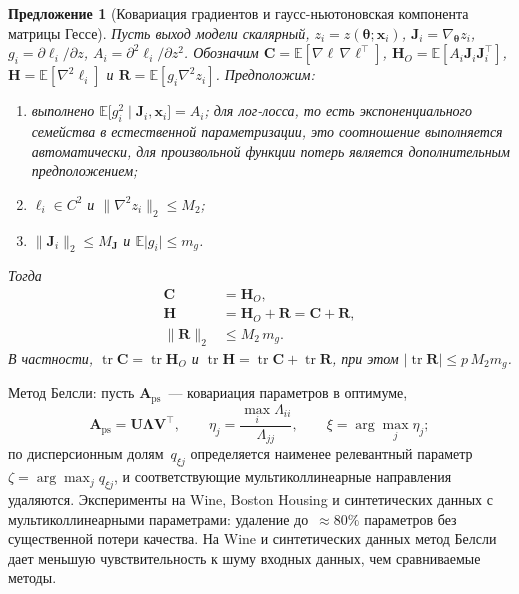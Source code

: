 \documentclass{dissert}
\newtheorem{proposition}[theorem]{Предложение}
\begin{document}
\begin{proposition}[Ковариация градиентов и гаусс-ньютоновская компонента матрицы Гессе]
Пусть выход модели скалярный, $z_i=z(\boldsymbol{\theta};\mathbf{x}_i)$, $\mathbf{J}_i=\nabla_{\boldsymbol{\theta}}z_i$, $g_i=\partial\ell_i/\partial z$, $A_i=\partial^2\ell_i/\partial z^2$.
Обозначим $\mathbf{C}=\mathbb{E}[\nabla\ell\,\nabla\ell^{\top}]$, $\mathbf{H}_O=\mathbb{E}[A_i\mathbf{J}_i\mathbf{J}_i^{\top}]$, $\mathbf{H}=\mathbb{E}[\nabla^2\ell_i]$ и $\mathbf{R}=\mathbb{E}[g_i\nabla^2z_i]$.
Предположим:
\begin{enumerate}[1)]
    \item выполнено $\mathbb{E}\bigl[g_i^2\mid\mathbf{J}_i,\mathbf{x}_i\bigr]=A_i$; для лог-лосса, то есть экспоненциального семейства в естественной параметризации, это соотношение выполняется автоматически, для произвольной функции потерь является дополнительным предположением;
    \item $\ell_i\in C^2$ и $\bigl\|\nabla^2z_i\bigr\|_2\le M_2$;
    \item $\bigl\|\mathbf{J}_i\bigr\|_2\le M_{\mathbf{J}}$ и $\mathbb{E}\lvert g_i\rvert\le m_g$.
\end{enumerate}
Тогда
\begin{align}
    \mathbf{C}&=\mathbf{H}_O,\\
    \mathbf{H}&=\mathbf{H}_O+\mathbf{R}=\mathbf{C}+\mathbf{R},\\
    \bigl\|\mathbf{R}\bigr\|_2&\le M_2\,m_g.
\end{align}
В частности, $\operatorname{tr}\mathbf{C}=\operatorname{tr}\mathbf{H}_O$ и $\operatorname{tr}\mathbf{H}=\operatorname{tr}\mathbf{C}+\operatorname{tr}\mathbf{R}$, при этом $\lvert\operatorname{tr}\mathbf{R}\rvert\le p\,M_2m_g$.
\end{proposition}

Метод Белсли: пусть $\mathbf{A}_{\mathrm{ps}}$~--- ковариация параметров в оптимуме,
\[
    \mathbf{A}_{\mathrm{ps}}=\mathbf{U}\boldsymbol{\Lambda}\mathbf{V}^\top,\qquad
    \eta_j=\frac{\max_i\Lambda_{ii}}{\Lambda_{jj}},\qquad
    \xi=\arg\max_j\eta_j;
\]
по дисперсионным долям~$q_{\xi j}$ определяется наименее релевантный параметр~$\zeta=\arg\max_j q_{\xi j}$, и соответствующие мультиколлинеарные направления удаляются.
Эксперименты на Wine, Boston Housing и синтетических данных с мультиколлинеарными параметрами: удаление до~$\approx 80\%$ параметров без существенной потери качества. На Wine и синтетических данных метод Белсли дает меньшую чувствительность к шуму входных данных, чем сравниваемые методы.
\end{document}
